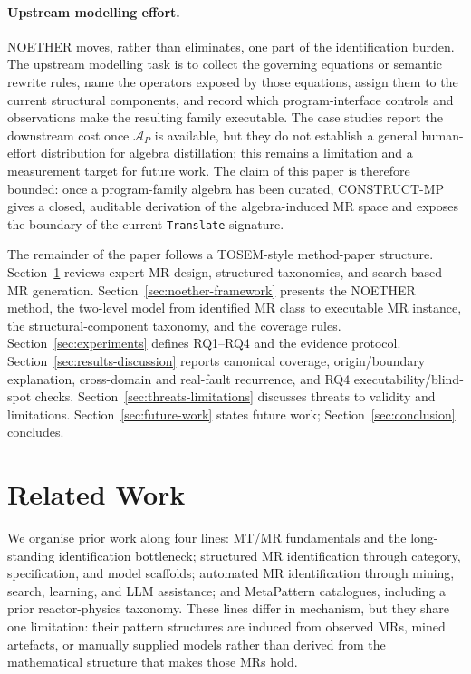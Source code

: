 \documentclass[acmsmall,screen,review]{acmart}
\begin{document}
\paragraph{Upstream modelling effort.} NOETHER moves, rather than eliminates, one part of the identification burden. The upstream modelling task is to collect the governing equations or semantic rewrite rules, name the operators exposed by those equations, assign them to the current structural components, and record which program-interface controls and observations make the resulting family executable. The case studies report the downstream cost once $\mathcal{A}_P$ is available, but they do not establish a general human-effort distribution for algebra distillation; this remains a limitation and a measurement target for future work. The claim of this paper is therefore bounded: once a program-family algebra has been curated, CONSTRUCT-MP gives a closed, auditable derivation of the algebra-induced MR space and exposes the boundary of the current \texttt{Translate} signature.

The remainder of the paper follows a TOSEM-style method-paper structure. Section~\ref{sec:related} reviews expert MR design, structured taxonomies, and search-based MR generation. Section~\ref{sec:noether-framework} presents the NOETHER method, the two-level model from identified MR class to executable MR instance, the structural-component taxonomy, and the coverage rules. Section~\ref{sec:experiments} defines RQ1--RQ4 and the evidence protocol. Section~\ref{sec:results-discussion} reports canonical coverage, origin/boundary explanation, cross-domain and real-fault recurrence, and RQ4 executability/blind-spot checks. Section~\ref{sec:threats-limitations} discusses threats to validity and limitations. Section~\ref{sec:future-work} states future work; Section~\ref{sec:conclusion} concludes.

\section{Related Work}
\label{sec:related}

We organise prior work along four lines: MT/MR fundamentals and the long-standing identification bottleneck; structured MR identification through category, specification, and model scaffolds; automated MR identification through mining, search, learning, and LLM assistance; and MetaPattern catalogues, including a prior reactor-physics taxonomy. These lines differ in mechanism, but they share one limitation: their pattern structures are induced from observed MRs, mined artefacts, or manually supplied models rather than derived from the mathematical structure that makes those MRs hold.
\end{document}
